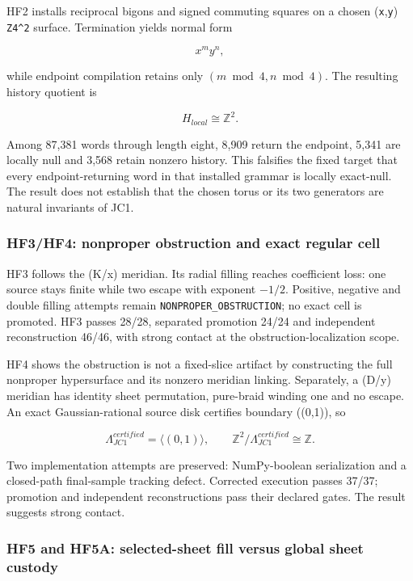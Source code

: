 HF2 installs reciprocal bigons and signed commuting squares on a chosen
(\texttt{x},\texttt{y}) \texttt{Z4\^{}2} surface. Termination yields
normal form

\[
x^my^n,
\]

while endpoint compilation retains only \((m\bmod4,n\bmod4)\). The
resulting history quotient is

\[
H_{local}\cong\mathbb Z^2.
\]

Among 87,381 words through length eight, 8,909 return the endpoint,
5,341 are locally null and 3,568 retain nonzero history. This falsifies
the fixed target that every endpoint-returning word in that installed
grammar is locally exact-null. The result does not establish that the
chosen torus or its two generators are natural invariants of JC1.

\subsubsection{HF3/HF4: nonproper obstruction and exact regular
cell}\label{viii-ch11-hf3hf4-nonproper-obstruction-and-exact-regular-cell}

HF3 follows the (K/x) meridian. Its radial filling reaches coefficient
loss: one source stays finite while two escape with exponent \(-1/2\).
Positive, negative and double filling attempts remain
\texttt{NONPROPER\_OBSTRUCTION}; no exact cell is promoted. HF3 passes
28/28, separated promotion 24/24 and independent reconstruction 46/46,
with strong contact at the obstruction-localization scope.

HF4 shows the obstruction is not a fixed-slice artifact by constructing
the full nonproper hypersurface and its nonzero meridian linking.
Separately, a (D/y) meridian has identity sheet permutation, pure-braid
winding one and no escape. An exact Gaussian-rational source disk
certifies boundary ((0,1)), so

\[
\Lambda_{JC1}^{certified}=\langle(0,1)\rangle,
\qquad
\mathbb Z^2/\Lambda_{JC1}^{certified}\cong\mathbb Z.
\]

Two implementation attempts are preserved: NumPy-boolean serialization
and a closed-path final-sample tracking defect. Corrected execution
passes 37/37; promotion and independent reconstructions pass their
declared gates. The result suggests strong contact.

\subsubsection{HF5 and HF5A: selected-sheet fill versus global sheet
custody}\label{viii-ch11-hf5-and-hf5a-selected-sheet-fill-versus-global-sheet-custody}

